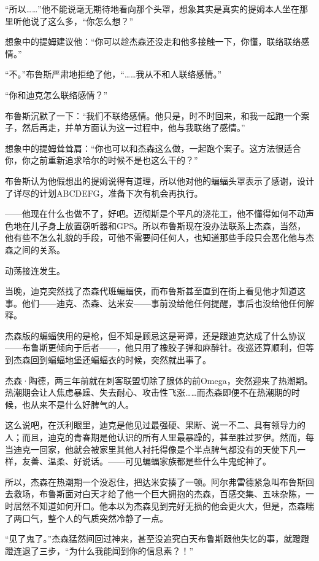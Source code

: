 \documentclass[../main]{subfiles}
\begin{document}
“所以\ldots\ldots”他不能说毫无期待地看向那个头罩，想象其实是真实的提姆本人坐在那里听他说了这么多，“你怎么想？”

想象中的提姆建议他：“你可以趁杰森还没走和他多接触一下，你懂，联络联络感情。”

“不。”布鲁斯严肃地拒绝了他，“……我从不和人联络感情。”

“你和迪克怎么联络感情？”

布鲁斯沉默了一下：“我们不联络感情。他只是，时不时回来，和我一起跑一个案子，然后再走，并单方面认为这一过程中，他与我联络了感情。”

想象中的提姆耸耸肩：“你也可以和杰森这么做，一起跑个案子。这方法很适合你，你之前重新追求哈尔的时候不是也这么干的？”

布鲁斯认为他假想出的提姆说得有道理，所以他对他的蝙蝠头罩表示了感谢，设计了详尽的计划ABCDEFG，准备下次有机会再执行。

——他现在什么也做不了，好吧。迈彻斯是个平凡的浇花工，他不懂得如何不动声色地在儿子身上放置窃听器和GPS。所以布鲁斯现在没办法联系上杰森，当然，他有些不怎么礼貌的手段，可他不需要问任何人，也知道那些手段只会恶化他与杰森之间的关系。

动荡接连发生。

当晚，迪克突然找了杰森代班蝙蝠侠，而布鲁斯甚至直到在街上看见他才知道这事。他们——迪克、杰森、达米安——事前没给他任何提醒，事后也没给他任何解释。

杰森版的蝙蝠侠用的是枪，但不知是顾忌这是哥谭，还是跟迪克达成了什么协议——布鲁斯更倾向于后者——，他只用了橡胶子弹和麻醉针。夜巡还算顺利，但等到杰森回到蝙蝠地堡还蝙蝠衣的时候，突然就出事了。

杰森·陶德，两三年前就在刺客联盟切除了腺体的前Omega，突然迎来了热潮期。热潮期会让人焦虑暴躁、失去耐心、攻击性飞涨……而杰森即便不在热潮期的时候，也从来不是什么好脾气的人。

这么说吧，在沃利眼里，迪克是他见过最强硬、果断、说一不二、具有领导力的人；而且，迪克的青春期是他认识的所有人里最暴躁的，甚至胜过罗伊。然而，每当迪克一回家，他就会被家里其他人衬托得像是个半点脾气都没有的天使下凡一样，友善、温柔、好说话。——可见蝙蝠家族都是些什么牛鬼蛇神了。

所以，杰森在热潮期一个没忍住，把达米安揍了一顿。阿尔弗雷德紧急叫布鲁斯回去救场，布鲁斯面对白天才给了他一个巨大拥抱的杰森，百感交集、五味杂陈，一时居然不知道如何开口。他本以为杰森见到完好无损的他会更火大，但是，杰森喘了两口气，整个人的气质突然冷静了一点。

“见了鬼了。”杰森猛然间回过神来，甚至没追究白天布鲁斯跟他失忆的事，就蹬蹬蹬连退了三步，“为什么我能闻到你的信息素？！”
\end{document}
